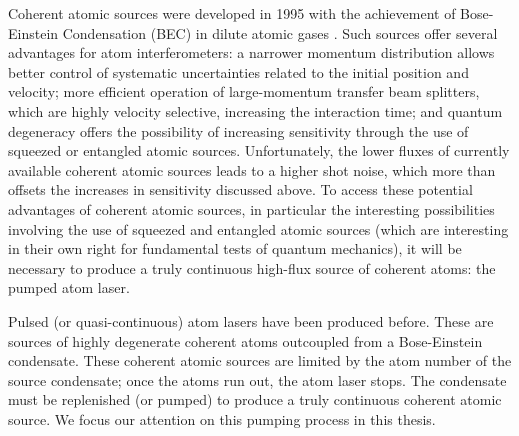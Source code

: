 Coherent atomic sources were developed in 1995 with the achievement of Bose-Einstein Condensation (BEC) in dilute atomic gases \citep{Anderson:1995vn,Bradley:1995ys,Davis:1995}.  Such sources offer several advantages for atom interferometers: a narrower momentum distribution allows better control of systematic uncertainties related to the initial position and velocity; more efficient operation of large-momentum transfer beam splitters, which are highly velocity selective, increasing the interaction time; and quantum degeneracy offers the possibility of increasing sensitivity through the use of squeezed or entangled atomic sources.  Unfortunately, the lower fluxes of currently available coherent atomic sources leads to a higher shot noise, which more than offsets the increases in sensitivity discussed above.  To access these potential advantages of coherent atomic sources, in particular the interesting possibilities involving the use of squeezed and entangled atomic sources (which are interesting in their own right for fundamental tests of quantum mechanics), it will be necessary to produce a truly continuous high-flux source of coherent atoms: the pumped atom laser.  

Pulsed (or quasi-continuous) atom lasers have been produced before.  These are sources of highly degenerate coherent atoms outcoupled from a Bose-Einstein condensate.  These coherent atomic sources are limited by the atom number of the source condensate; once the atoms run out, the atom laser stops.  The condensate must be replenished (or pumped) to produce a truly continuous coherent atomic source.  We focus our attention on this pumping process in this thesis.






